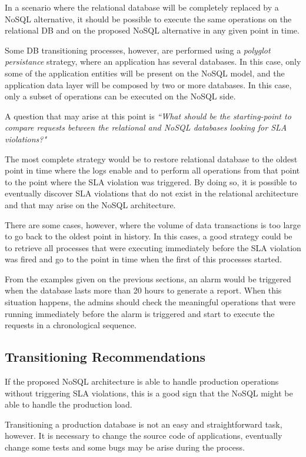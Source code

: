 In a scenario where the relational database will be completely replaced by a NoSQL alternative, it should be possible to execute the same operations on the relational DB and on the proposed NoSQL alternative in any given point in time.

Some DB transitioning processes, however, are performed using a \textit{polyglot persistance} strategy, where an application has several databases. In this case, only some of the application entities will be present on the NoSQL model, and the application data layer will be composed by two or more databases. In this case, only a subset of operations can be executed on the NoSQL side.

A question that may arise at this point is \textit{``What should be the starting-point to compare requests between the relational and NoSQL databases looking for SLA violations?"}

The most complete strategy would be to restore relational database to the oldest point in time where the logs enable and to perform all operations from that point to the point where the SLA violation was triggered. By doing so, it is possible to eventually discover SLA violations that do not exist in the relational architecture and that may arise on the NoSQL architecture.

There are some cases, however, where the volume of data transactions is too large to go back to the oldest point in history. In this cases, a good strategy could be to retrieve all processes that were executing immediately before the SLA violation was fired and go to the point in time when the first of this processes started. 

From the examples given on the previous sections, an alarm would be triggered when the database lasts more than 20 hours to generate a report. When this situation happens, the admins should check the meaningful operations that were running immediately before the alarm is triggered and start to execute the requests in a chronological sequence. 

\subsection{Transitioning Recommendations}
\label{transitioning-recommendations}
If the proposed NoSQL architecture is able to handle production operations without triggering SLA violations, this is a good sign that the NoSQL might be able to handle the production load.

Transitioning a production database is not an easy and straightforward task, however. It is necessary to change the source code of applications, eventually change some tests and some bugs may be arise during the process. 

